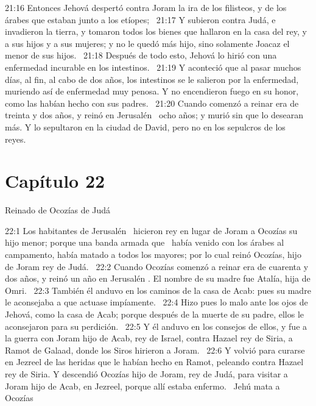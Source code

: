 																					21:16 Entonces Jehová despertó contra Joram la ira de los filisteos, y de los árabes que estaban junto a los etíopes;  
																					21:17 Y subieron contra Judá, e invadieron la tierra, y tomaron todos los bienes que hallaron en la casa del rey, y a sus hijos y a sus mujeres; y no le quedó más hijo, sino solamente Joacaz el menor de sus hijos.  
																					21:18 Después de todo esto, Jehová lo hirió con una enfermedad incurable en los intestinos.  
																					21:19 Y aconteció que al pasar muchos días, al fin, al cabo de dos años, los intestinos se le salieron por la enfermedad, muriendo así de enfermedad muy penosa. Y no encendieron fuego en su honor, como las habían hecho con sus padres.  
																					21:20 Cuando comenzó a reinar era de treinta y dos años, y reinó en Jerusalén  ocho años; y murió sin que lo desearan más. Y lo sepultaron en la ciudad de David, pero no en los sepulcros de los reyes.  
																					\section*{Capítulo 22}
																						Reinado de Ocozías de Judá  
																						
																						
																						22:1 Los habitantes de Jerusalén  hicieron rey en lugar de Joram a Ocozías su hijo menor; porque una banda armada que  había venido con los árabes al campamento, había matado a todos los mayores; por lo cual reinó Ocozías, hijo de Joram rey de Judá.  
																						22:2 Cuando Ocozías comenzó a reinar era de cuarenta y dos años, y reinó un año en Jerusalén . El nombre de su madre fue Atalía, hija de Omri.  
																						22:3 También él anduvo en los caminos de la casa de Acab: pues su madre le aconsejaba a que actuase impíamente.  
																						22:4 Hizo pues lo malo ante los ojos de Jehová, como la casa de Acab; porque después de la muerte de su padre, ellos le aconsejaron para su perdición.  
																						22:5 Y él anduvo en los consejos de ellos, y fue a la guerra con Joram hijo de Acab, rey de Israel, contra Hazael rey de Siria, a Ramot de Galaad, donde los Siros hirieron a Joram.  
																						22:6 Y volvió para curarse en Jezreel de las heridas que le habían hecho en Ramot, peleando contra Hazael rey de Siria. Y descendió Ocozías hijo de Joram, rey de Judá, para visitar a Joram hijo de Acab, en Jezreel, porque allí estaba enfermo.  
																						Jehú mata a Ocozías  
																						
